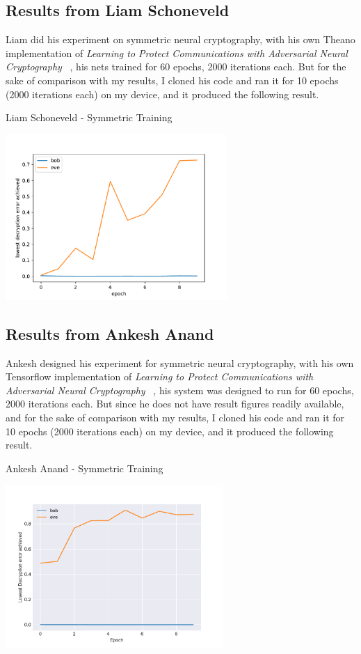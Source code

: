 \documentclass[a4paper, 12pt]{report}
\begin{document}
\subsection{\textbf{Results from Liam Schoneveld}~\citep{nlml/adversarial-neural-cryptography}}
Liam did his experiment on symmetric neural cryptography, with his own Theano implementation of \textit{Learning to Protect Communications with Adversarial Neural Cryptography} ~\citep{DBLP:journals/corr/AbadiA16}, his nets trained for 60 epochs, 2000 iterations each.
But for the sake of comparison with my results, I cloned his code and ran it for 10 epochs (2000 iterations each) on my device, and it produced the following result.
\begin{blockfigure}{Liam Schoneveld - Symmetric Training}
	\begin{center}
		\includegraphics[width = 0.63\textwidth]{nlml_results_conv}
	\end{center}
\end{blockfigure}
\subsection{\textbf{Results from Ankesh Anand}~\citep{ankeshanand/neural-cryptography-tensorflow}}
Ankesh designed his experiment for symmetric neural cryptography, with his own Tensorflow implementation of \textit{Learning to Protect Communications with Adversarial Neural Cryptography} ~\citep{DBLP:journals/corr/AbadiA16}, his system was designed to run for 60 epochs, 2000 iterations each.
But since he does not have result figures readily available, and for the sake of comparison with my results, I cloned his code and ran it for 10 epochs (2000 iterations each) on my device, and it produced the following result.
\begin{blockfigure}{Ankesh Anand - Symmetric Training}
	\begin{center}
		\includegraphics[width = 0.62\textwidth]{ankesh_results_conv}
	\end{center}
\end{blockfigure}
\newpage
\end{document}

